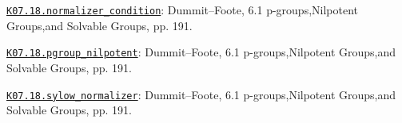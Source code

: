 \par\smallskip\noindent\hypertarget{src:K07.18.normalizer_condition}{}\label{src:K07.18.normalizer_condition}\hyperref[K07.18.normalizer_condition]{\texttt{K07.18.normalizer\_condition}}: Dummit--Foote, 6.1 p-groups,Nilpotent Groups,and Solvable Groups, pp. 191.
\par\smallskip\noindent\hypertarget{src:K07.18.pgroup_nilpotent}{}\label{src:K07.18.pgroup_nilpotent}\hyperref[K07.18.pgroup_nilpotent]{\texttt{K07.18.pgroup\_nilpotent}}: Dummit--Foote, 6.1 p-groups,Nilpotent Groups,and Solvable Groups, pp. 191.
\par\smallskip\noindent\hypertarget{src:K07.18.sylow_normalizer}{}\label{src:K07.18.sylow_normalizer}\hyperref[K07.18.sylow_normalizer]{\texttt{K07.18.sylow\_normalizer}}: Dummit--Foote, 6.1 p-groups,Nilpotent Groups,and Solvable Groups, pp. 191.
